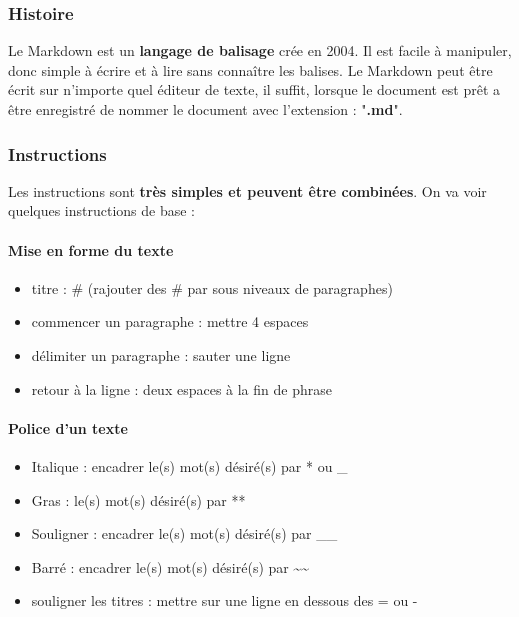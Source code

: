 \subsubsection{Histoire}

Le Markdown est un \textbf{langage de balisage} crée en 2004. Il est facile à
manipuler, donc simple à écrire et à lire sans connaître les balises.
Le Markdown peut être écrit sur n'importe quel éditeur de texte, il suffit,
lorsque le document est prêt a être enregistré de nommer le document avec
l'extension : "\textbf{.md}".


\subsubsection{Instructions}

Les instructions sont \textbf{très simples et peuvent être combinées}.
On va voir quelques instructions de base :

\paragraph{Mise en forme du texte}
\begin{itemize}
  \item titre : \# (rajouter des \# par sous niveaux de paragraphes)
	\item commencer un paragraphe : mettre 4 espaces
	\item délimiter un paragraphe : sauter une ligne
	\item retour à la ligne : deux espaces à la fin de phrase
\end{itemize}

\paragraph{Police d'un texte}
\begin{itemize}
	\item Italique : encadrer le(s) mot(s) désiré(s) par * ou \_
	\item Gras :  le(s) mot(s) désiré(s) par **
	\item Souligner : encadrer le(s) mot(s) désiré(s) par \_\_
	\item Barré : encadrer le(s) mot(s) désiré(s) par \~{}\~{}
	\item souligner les titres : mettre sur une ligne en dessous des = ou -
\end{itemize}

